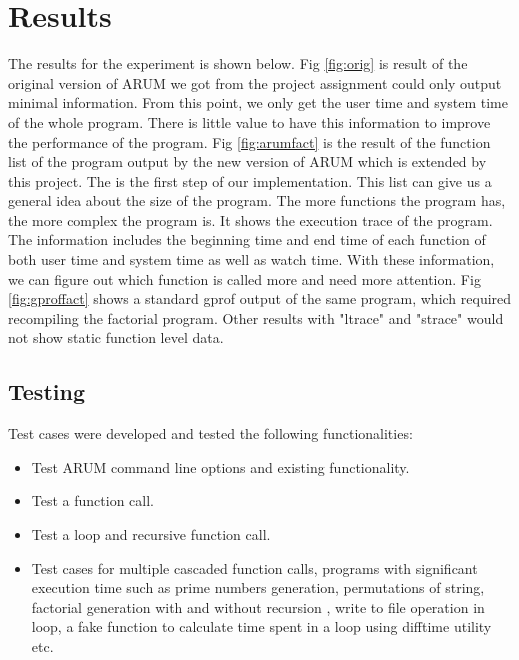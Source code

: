 \documentclass[11pt,letterpaper,oneside]{article}
\begin{document}
\section{Results}
\label{sec:resultsa}

The results for the experiment is shown below.   Fig \ref{fig:orig} is result of the original version of ARUM we got from the project assignment could only output minimal information. From this point, we only get the user time and system time of the whole program. There is little value to have this information to improve the performance of the program. Fig \ref{fig:arumfact} is the result of the function list of the program output by the new version of ARUM which is extended by this project. The is the first step of our implementation. This list can give us a general idea about the size of the program. The more functions the program has, the more complex the program is. It shows the execution trace of the program. The information includes the beginning time and end time of each function of both user time and system time as well as watch time. With these information, we can figure out which function is called more and need more attention.  Fig \ref{fig:gproffact} shows a standard gprof output of the same program, which required recompiling the factorial program.   Other results with "ltrace" and "strace" would not show static function level data.

\subsection{Testing}

Test cases were developed and tested the following functionalities:
\begin{itemize}
\item Test ARUM command line options and existing functionality.
\item Test a function call.
\item Test a loop and recursive function call.
\item Test cases for multiple cascaded function calls, programs with significant execution time such as prime numbers generation, permutations of string, factorial generation with and without recursion , write to file operation in loop,  a fake function to calculate time spent in a loop using difftime utility etc. 
\end{itemize}
\end{document}
